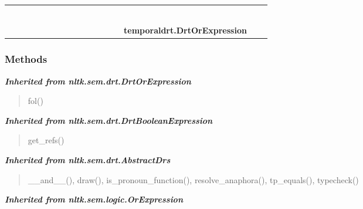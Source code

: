 \begin{tabular}{cccccccccccccccccc}
&&\multicolumn{1}{|c}{}
  \\\cline{11-11}
  &&&&&&&&&&\multicolumn{1}{c|}{}
&&
&\multicolumn{1}{|c}{}&
&\multicolumn{1}{|c}{}&
  \\
\multicolumn{12}{r}{\settowidth{\BCL}{nltk.sem.logic.OrExpression}\multirow{2}{\BCL}{nltk.sem.logic.OrExpression}}
&&\multicolumn{1}{|c}{}
&&\multicolumn{1}{|c}{}
  \\\cline{13-13}
  &&&&&&&&&&&&\multicolumn{1}{c|}{}
&\multicolumn{1}{|c}{}&
&\multicolumn{1}{|c}{}&
  \\
\multicolumn{14}{r}{\settowidth{\BCL}{nltk.sem.drt.DrtOrExpression}\multirow{2}{\BCL}{nltk.sem.drt.DrtOrExpression}}
&&\multicolumn{1}{|c}{}
  \\\cline{15-15}
  &&&&&&&&&&&&&&\multicolumn{1}{c|}{}
&\multicolumn{1}{|c}{}&
  \\
&&&&&&&&&&&&&&\multicolumn{2}{l}{\textbf{temporaldrt.DrtOrExpression}}
\end{tabular}



  \subsubsection{Methods}


\large{\textbf{\textit{Inherited from nltk.sem.drt.DrtOrExpression}}}

\begin{quote}
fol()
\end{quote}

\large{\textbf{\textit{Inherited from nltk.sem.drt.DrtBooleanExpression}}}

\begin{quote}
get\_refs()
\end{quote}

\large{\textbf{\textit{Inherited from nltk.sem.drt.AbstractDrs}}}

\begin{quote}
\_\_and\_\_(), draw(), is\_pronoun\_function(), resolve\_anaphora(), tp\_equals(), typecheck()
\end{quote}

\large{\textbf{\textit{Inherited from nltk.sem.logic.OrExpression}}}

